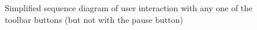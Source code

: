\documentclass[a4paper]{article}
\begin{document}
	\begin{figure}[ht]
	\centering
	\caption{Simplified sequence diagram of user interaction with any one of the toolbar buttons (but not with the pause button)}
	\label{fig:sd_server_userinteraction}
	\end{figure}
	
	
	
	
	
	
\end{document}
